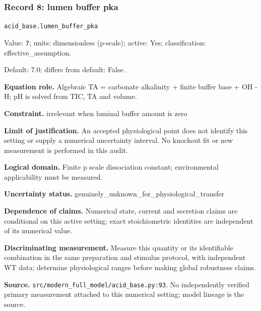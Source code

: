 \subsubsection*{Record 8: lumen buffer pka}
{\small \nolinkurl{acid_base.lumen_buffer_pka}\par

Value: \texttt{7}; units: dimensionless (p-scale); active: Yes; classification: effective\_assumption.\par

Default: 7.0; differs from default: False.\par

\textbf{Equation role.} Algebraic TA = carbonate alkalinity + finite buffer base + OH - H; pH is solved from TIC, TA and volume.\par

\textbf{Constraint.} irrelevant when luminal buffer amount is zero\par

\textbf{Limit of justification.} An accepted physiological point does not identify this setting or supply a numerical uncertainty interval. No knockout fit or new measurement is performed in this audit.\par

\textbf{Logical domain.} Finite p scale dissociation constant; environmental applicability must be measured.\par

\textbf{Uncertainty status.} genuinely\_unknown\_for\_physiological\_transfer\par

\textbf{Dependence of claims.} Numerical state, current and secretion claims are conditional on this active setting; exact stoichiometric identities are independent of its numerical value.\par

\textbf{Discriminating measurement.} Measure this quantity or its identifiable combination in the same preparation and stimulus protocol, with independent WT data; determine physiological ranges before making global robustness claims.\par

\textbf{Source.} \nolinkurl{src/modern_full_model/acid_base.py:93}. No independently verified primary measurement attached to this numerical setting; model lineage is the source.\par}

